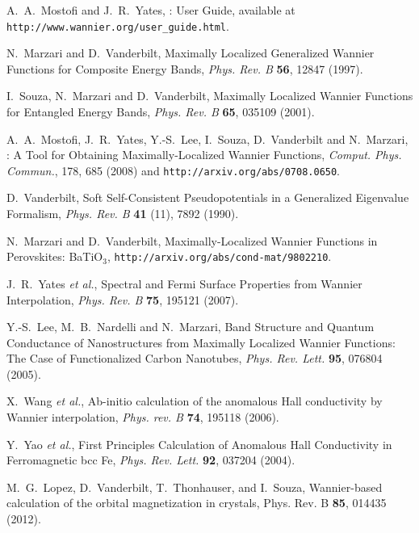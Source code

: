 \documentclass[a4paper,11pt,twoside]{article}
\begin{document}
\cleardoublepage


\begin{thebibliography}{99}

 A.~A.~Mostofi and J.~R.~Yates, \wannier: User
  Guide, available at {\tt http://www.wannier.org/user\_guide.html}.

 N.~Marzari and D.~Vanderbilt, 
  Maximally Localized Generalized Wannier Functions for Composite
  Energy Bands, {\it Phys. Rev. B} {\bf 56}, 12847 (1997).  

 I.~Souza, N.~Marzari and D.~Vanderbilt, Maximally
     Localized Wannier Functions for Entangled Energy Bands, {\it
     Phys. Rev. B} {\bf 65}, 035109 (2001).

 A.~A.~Mostofi, J.~R.~Yates, Y.-S.~Lee, I.~Souza,
   D.~Vanderbilt and N.~Marzari, \wannier: A Tool for Obtaining
   Maximally-Localized Wannier Functions, {\it Comput. Phys. Commun.},
   178, 685 (2008) and {\tt http://arxiv.org/abs/0708.0650}.

 D.~Vanderbilt, Soft Self-Consistent Pseudopotentials in
  a Generalized Eigenvalue Formalism, {\it Phys. Rev. B} {\bf 41}
  (11), 7892 (1990).

 N.~Marzari and D.~Vanderbilt, Maximally-Localized
  Wannier Functions in Perovskites: BaTiO$_3$,
  {\tt http://arxiv.org/abs/cond-mat/9802210}.

 J.~R.~Yates {\it et al.}, Spectral and Fermi
  Surface Properties from Wannier Interpolation, {\it Phys. Rev. B}
  {\bf 75}, 195121 (2007). 

 Y.-S.~Lee, M.~B.~Nardelli and N.~Marzari, Band
  Structure and Quantum Conductance of Nanostructures from Maximally
  Localized Wannier Functions: The Case of Functionalized Carbon
  Nanotubes, {\it Phys. Rev. Lett.} {\bf 95}, 076804 (2005).

 X.~Wang {\it et al.}, Ab-initio calculation of
  the anomalous Hall conductivity by Wannier interpolation,
{\it Phys. rev. B} {\bf 74}, 195118 (2006).

 Y.~Yao {\it et al.}, First Principles Calculation
  of Anomalous Hall Conductivity in Ferromagnetic bcc Fe,
{\it Phys. Rev. Lett.} {\bf 92}, 037204 (2004).

 M.~G.~Lopez, D.~Vanderbilt, T.~Thonhauser, and I.~Souza,
Wannier-based calculation of the orbital magnetization in crystals,
Phys. Rev. B {\bf 85}, 014435 (2012).

\end{thebibliography}
\end{document}
